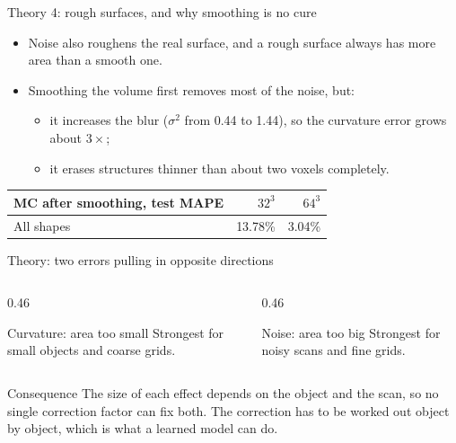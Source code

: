 \documentclass[aspectratio=169,11pt]{beamer}
\begin{document}
\begin{frame}{Theory 4: rough surfaces, and why smoothing is no cure}
  \begin{itemize}
    \item Noise also roughens the real surface, and a rough surface always has more area than a
          smooth one.
    \item Smoothing the volume first removes most of the noise, but:
          \begin{itemize}
            \item it increases the blur ($\sigma^2$ from 0.44 to 1.44), so the curvature error
                  grows about $3\times$;
            \item it erases structures thinner than about two voxels completely.
          \end{itemize}
  \end{itemize}
  \vspace{0.5em}
  \centering
  \begin{tabular}{lrr}
    \toprule
    MC after smoothing, test MAPE & $32^3$ & $64^3$ \\
    \midrule
    All shapes & 13.78\% & 3.04\% \\
    \bottomrule
  \end{tabular}
\end{frame}

\begin{frame}{Theory: two errors pulling in opposite directions}
  \begin{columns}[T]
    \begin{column}{0.46\textwidth}
      \begin{block}{Curvature: area too small}
        Strongest for small objects and coarse grids.
      \end{block}
    \end{column}
    \begin{column}{0.46\textwidth}
      \begin{block}{Noise: area too big}
        Strongest for noisy scans and fine grids.
      \end{block}
    \end{column}
  \end{columns}
  \vspace{1em}
  \begin{alertblock}{Consequence}
    The size of each effect depends on the object and the scan, so no single correction factor can
    fix both. The correction has to be worked out object by object, which is what a learned model
    can do.
  \end{alertblock}
\end{frame}
\end{document}
